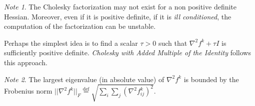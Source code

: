\documentclass[a4paper, 10pt, twocolumn]{article}
\theoremstyle{definition}
\theoremstyle{remark}
\newtheorem*{note}{Note}
\begin{document}
\begin{note} The Cholesky factorization may not exist for a non positive definite Hessian. Moreover, even if it is positive definite, if it is \textit{ill conditioned}, the computation of the factorization can be unstable.
\end{note}

Perhaps the simplest idea is to find a scalar $\tau > 0$ such that $\nabla^2f^k + \tau I$ is sufficiently positive definite. \textit{Cholesky with Added Multiple of the Identity} follows this approach.

\begin{note}
The largest eigenvalue (in absolute value) of $\nabla^2f^k$ is bounded by the Frobenius norm $|| \nabla^2f^k ||_F \overset{\text{def}}{=} \sqrt{\sum_i\sum_j(\nabla^2f^k_{ij})^2}$.
\end{note}
\end{document}

